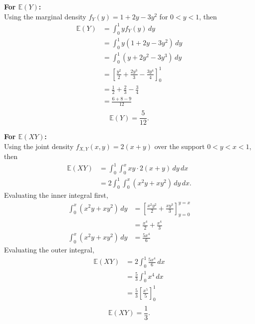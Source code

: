\documentclass[letterpaper,12pt]{article}
\begin{document}
\begin{enumerate}[(a)]
\begin{list}{}{}
        \textbf{For $\mathbb{E}(Y)$:} \\
        Using the marginal density $f_Y(y) = 1 + 2y - 3y^2$ for $0 < y < 1$, then
        \begin{align*}
        \mathbb{E}(Y) &= \int_{0}^{1} y f_Y(y) \, dy \\
        &= \int_{0}^{1} y (1 + 2y - 3y^2) \, dy \\
        &= \int_{0}^{1} (y + 2y^2 - 3y^3) \, dy \\
        &= \left[ \frac{y^2}{2} + \frac{2y^3}{3} - \frac{3y^4}{4} \right]_0^1 \\
        &= \frac{1}{2} + \frac{2}{3} - \frac{3}{4} \\
        &= \frac{6 + 8 - 9}{12} \\
        \end{align*}
        \[             \boxed{        \mathbb{E}(Y) = \frac{5}{12}.}        \]

        \textbf{For $\mathbb{E}(XY)$:} \\
        Using the joint density $f_{X,Y}(x,y) = 2(x+y)$ over the support $0 < y < x < 1$, then
        \begin{align*}
        \mathbb{E}(XY) &= \int_{0}^{1} \int_{0}^{x} xy \cdot 2(x+y) \, dy \, dx \\
        &= 2 \int_{0}^{1} \int_{0}^{x} (x^2 y + x y^2) \, dy \, dx.
        \end{align*}
        Evaluating the inner integral first,
       \begin{align*}
        \int_{0}^{x} (x^2 y + x y^2) \, dy &= \left[ \frac{x^2 y^2}{2} + \frac{x y^3}{3} \right]_{y=0}^{y=x} \\
        &= \frac{x^4}{2} + \frac{x^4}{3} \\
        \int_{0}^{x} (x^2 y + x y^2) \, dy &= \frac{5x^4}{6}
        \end{align*}
        Evaluating the outer integral,
        \begin{align*}
        \mathbb{E}(XY) &= 2 \int_{0}^{1} \frac{5x^4}{6} \, dx \\
        &= \frac{5}{3} \int_{0}^{1} x^4 \, dx \\
        &= \frac{5}{3} \left[ \frac{x^5}{5} \right]_0^1 \\
        \end{align*}
        \[             \boxed{\mathbb{E}(XY) = \frac{1}{3}.}
        \]


\end{list}
\end{enumerate}
\end{document}

